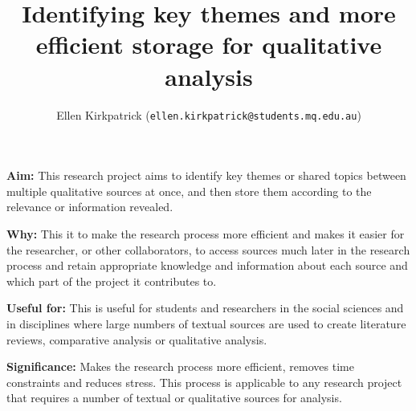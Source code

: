 \documentclass[unknownkeysallowed,usepdftitle=false, parskip=full]{beamer}
\title{Identifying key themes and more efficient storage for qualitative analysis}
\author{Ellen Kirkpatrick\inst{1} (\texttt{ellen.kirkpatrick@students.mq.edu.au}) \inst{1}}
\institute{\inst{1}Macquarie University, Sydney, NSW}
\newcommand{\secvariable}{nothing}
\newcommand{\mysection}[1]{\renewcommand{\secvariable}{#1}
}
\begin{document}
\mysection{abstract}
\begin{frame}\label{\secvariable}


\parbox{\linewidth}{


\textbf{Aim:} This research project aims to identify key themes or shared topics between multiple qualitative sources at once, and then store them according to the relevance or information revealed.
\vspace{12pt}

\textbf{Why:} This it to make the research process more efficient and makes it easier for the researcher, or other collaborators, to access sources much later in the research process and retain appropriate knowledge and information about each source and which part of the project it contributes to.
\vspace{12pt}

\textbf{Useful for:} This is useful for students and researchers in the social sciences and in disciplines where large numbers of textual sources are used to create literature reviews, comparative analysis or qualitative analysis.
\vspace{12pt}

\textbf{Significance:} Makes the research process more efficient, removes time constraints and reduces stress. This process is applicable to any research project that requires a number of textual or qualitative sources for analysis.
}
 
 
  
\end{frame}
\end{document}
